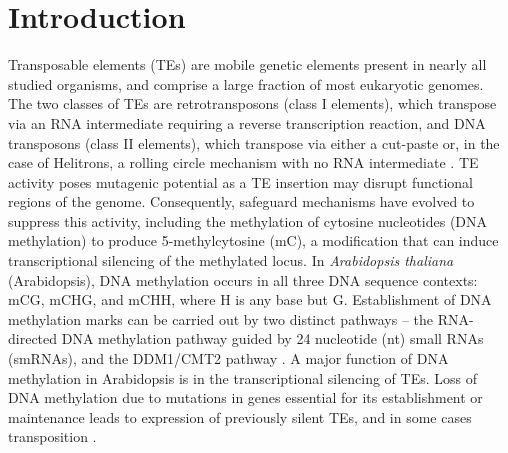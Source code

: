 \documentclass[12pt]{article}
\begin{document}
\pagebreak

\section{Introduction}

Transposable elements (TEs) are mobile genetic elements present in
nearly all studied organisms, and comprise a large fraction of most
eukaryotic genomes. The two classes of TEs are retrotransposons (class
I elements), which transpose via an RNA intermediate requiring a
reverse transcription reaction, and DNA transposons (class II
elements), which transpose via either a cut-paste or, in the case of
Helitrons, a rolling circle mechanism with no RNA intermediate
\cite{Wicker:2007en}. TE activity poses mutagenic potential as a TE
insertion may disrupt functional regions of the genome. Consequently,
safeguard mechanisms have evolved to suppress this activity, including
the methylation of cytosine nucleotides (DNA methylation) to produce
5-methylcytosine (mC), a modification that can induce transcriptional
silencing of the methylated locus. In \emph{Arabidopsis thaliana}
(Arabidopsis), DNA methylation occurs in all three DNA sequence
contexts: mCG, mCHG, and mCHH, where H is any base but
G. Establishment of DNA methylation marks can be carried out by two
distinct pathways -- the RNA-directed DNA methylation pathway guided
by 24 nucleotide (nt) small RNAs (smRNAs), and the DDM1/CMT2 pathway
\cite{Zemach:2013dj, Matzke:2014ek}. A major function of DNA
methylation in Arabidopsis is in the transcriptional silencing of TEs.
Loss of DNA methylation due to mutations in genes essential for its
establishment or maintenance leads to expression of previously silent
TEs, and in some cases transposition \cite{Mirouze:2009km,Miura:2001eg, Saze:2003du, Lippman:2004cm, Jeddeloh:1999gu,Zemach:2013dj}.
\end{document}
